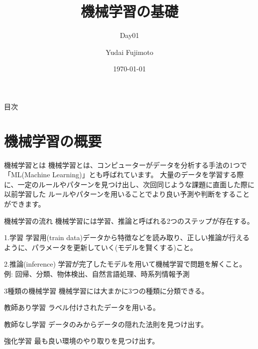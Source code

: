 \documentclass[aspectratio=169, dvipdfmx, 11pt]{beamer} %
\title[Day01]{機械学習の基礎}
\subtitle{Day01}
\author[Yudai Fujimoto]{Yudai Fujimoto}
\institute[SUS]{Suwa University of Science}
\date{\today}
\begin{document}
\maketitle

\begin{frame}{目次}
    \tableofcontents
\end{frame}

\section{機械学習の概要}
\begin{frame}{機械学習とは}
    機械学習とは、コンピューターがデータを分析する手法の1つで「ML(Machine Learning)」とも呼ばれています。
    大量のデータを学習する際に、一定のルールやパターンを見つけ出し、次回同じような課題に直面した際に以前学習した
    ルールやパターンを用いることでより良い予測や判断をすることができます。
\end{frame}

\begin{frame}{機械学習の流れ}
    機械学習には学習、推論と呼ばれる2つのステップが存在する。
    \begin{block}{1.学習}
    学習用(train data)データから特徴などを読み取り、正しい推論が行えるように、パラメータを更新していく(モデルを賢くする)こと。
    \end{block}
    \begin{alertblock}{2.推論(inference)}
    学習が完了したモデルを用いて機械学習で問題を解くこと。 \\
    例: 回帰、分類、物体検出、自然言語処理、時系列情報予測
    \end{alertblock}
\end{frame}

\begin{frame}{3種類の機械学習}
    機械学習には大まかに3つの種類に分類できる。
    \begin{block}{教師あり学習}
    ラベル付けされたデータを用いる。
    \end{block}
    \begin{alertblock}{教師なし学習}
    データのみからデータの隠れた法則を見つけ出す。
    \end{alertblock}
    \begin{exampleblock}{強化学習}
    最も良い環境のやり取りを見つけ出す。
    \end{exampleblock}
\end{frame}
\end{document}
